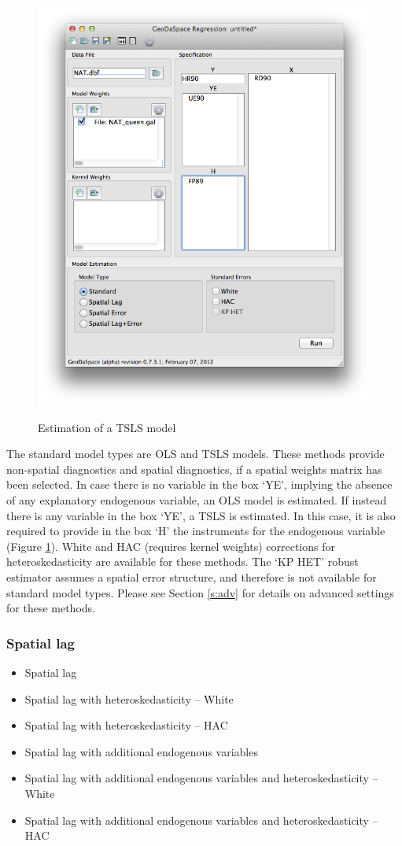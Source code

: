 \documentclass{article}
\begin{document}
\begin{figure}[htb]
\caption{Estimation of a TSLS model}
\label{f:tsls}
\begin{center}
\includegraphics[width=0.7\linewidth]{tsls.png}\\
\end{center}
\end{figure}

The standard model types are OLS and TSLS models. These methods provide non-spatial diagnostics and spatial diagnostics, if a spatial weights matrix has been selected. In case there is no variable in the box `YE', implying the absence of any explanatory endogenous variable, an OLS model is estimated. If instead there is any variable in the box `YE', a TSLS is estimated. In this case, it is also required to provide in the box `H' the instruments for the endogenous variable (Figure \ref{f:tsls}). White and HAC (requires kernel weights) corrections for heteroskedasticity are available for these methods. The `KP HET' robust estimator assumes a spatial error structure, and therefore is not available for standard model types. Please see Section \ref{s:adv} for details on advanced settings for these methods.

\subsubsection*{Spatial lag}
\begin{itemize}
\item Spatial lag
\item Spatial lag with heteroskedasticity -- White
\item Spatial lag with heteroskedasticity -- HAC
\item Spatial lag with additional endogenous variables
\item Spatial lag with additional endogenous variables and heteroskedasticity -- White
\item Spatial lag with additional endogenous variables and heteroskedasticity -- HAC
\end{itemize}
\end{document}
